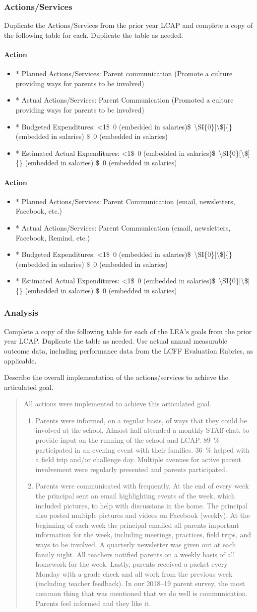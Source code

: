 \documentclass{article}
\newcommand{\dollar}[1]{\SI{#1}[\$]{}}
\newcommand{\trydollar}[1]{%
	\ifnum9<1#1\relax\dollar{#1}%
	\else%
		#1%
	\fi%
}
\newcounter{goal}[section] %
\newcounter{action}[goal]
\newcommand{\actionupdate}[4]{
	\stepcounter{action}
	\paragraph{Action \theaction}
	\begin{itemize}
		\item* Planned Actions/Services: #1
		\item* Actual Actions/Services: #2
		\item* Budgeted Expenditures: 
			\trydollar{#3}
		\item* Estimated Actual Expenditures: 
			\trydollar{#4}
	\end{itemize}
}
\newenvironment{actionanalysis}
	{
		\begin{enumerate}[{\bf {Action} 1:}]
	}
	{
		\end{enumerate}
	}
\begin{document}
\subsubsection{Actions/Services}
Duplicate the Actions/Services from the prior year LCAP and complete a copy of the following table for each. Duplicate the table as needed.
\actionupdate
	{Parent communication (Promote a culture providing ways for parents to be involved)}
	{Parent Communication (Promoted a culture providing ways for parents to be involved)}
	{\dollar{0} (embedded in salaries)}
	{\dollar{0} (embedded in salaries)}

\actionupdate
	{Parent Communication (email, newsletters, Facebook, etc.)}
	{Parent Communication (email, newsletters, Facebook, Remind, etc.)}
	{\dollar{0} (embedded in salaries)}
	{\dollar{0} (embedded in salaries)}

\subsubsection{Analysis}
Complete a copy of the following table for each of the LEA's goals from the prior year LCAP. Duplicate the table as needed. Use actual annual measurable outcome data, including performance data from the LCFF Evaluation Rubrics, as applicable.

Describe the overall implementation of the actions/services to achieve the articulated goal.
\begin{quotation}
	All actions were implemented to achieve this articulated goal.
	\begin{actionanalysis}
	\item Parents were informed, on a regular basis, of ways that they could be involved at the school. Almost half attended a monthly STAff chat, to provide input on the running of the school and LCAP. \SI{89}{\percent} participated in an evening event with their families. \SI{36}{\percent} helped with a field trip and/or challenge day. Multiple avenues for active parent involvement were regularly presented and parents participated.
	\item Parents were communicated with frequently. At the end of every week the principal sent an email highlighting events of the week, which included pictures, to help with discussions in the home. The principal also posted multiple pictures and videos on Facebook (weekly). At the beginning of each week the principal emailed all parents important information for the week, including meetings, practices, field trips, and ways to be involved. A quarterly newsletter was given out at each family night. All teachers notified parents on a weekly basis of all homework for the week. Lastly, parents received a packet every Monday with a grade check and all work from the previous week (including teacher feedback). In our 2018--19 parent survey, the most common thing that was mentioned that we do well is communication. Parents feel informed and they like it.
	\end{actionanalysis}
\end{quotation}
\end{document}
